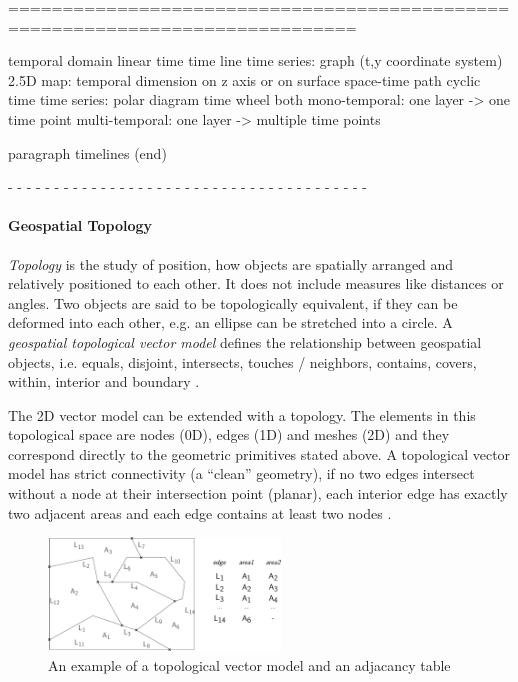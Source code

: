 ==============================================================================


temporal domain
  linear time
    time line
    time series: graph (t,y coordinate system)
    2.5D map: temporal dimension on z axis or on surface
    space-time path
  cyclic time
    time series: polar diagram
    time wheel
  both
    mono-temporal: one layer -> one time point
    multi-temporal: one layer -> multiple time points
\cite[p. 144]{ott2001time}

paragraph timelines (end)


- - - - - - - - - - - - - - - - - - - - - - - - - - - - - - - - - - - - - - -
\paragraph{Geospatial Topology} %
\label{par:geospatial_topology}

\emph{Topology} is the study of position, how objects are spatially arranged and relatively positioned to each other. It does not include measures like distances or angles. Two objects are said to be topologically equivalent, if they can be deformed into each other, e.g. an ellipse can be stretched into a circle. A \emph{geospatial topological vector model} defines the relationship between geospatial objects, i.e. equals, disjoint, intersects, touches / neighbors, contains, covers, within, interior and boundary
\cite{clementiniTopology}.

The 2D vector model can be extended with a topology. The elements in this topological space are nodes (0D), edges (1D) and meshes (2D) and they correspond directly to the geometric primitives stated above. A topological vector model has strict connectivity (a ``clean'' geometry), if no two edges intersect without a node at their intersection point (planar), each interior edge has exactly two adjacent areas and each edge contains at least two nodes
\cite[pp.37-39]{bolstad2008gis}.

\begin{figure}[ht]
  \centering
  \includegraphics[width=0.55\textwidth]{graphics/basics/topological_vector_model}
  \caption{An example of a topological vector model and an adjacancy table}
  \label{fig:topological_vector_model}
\end{figure}

